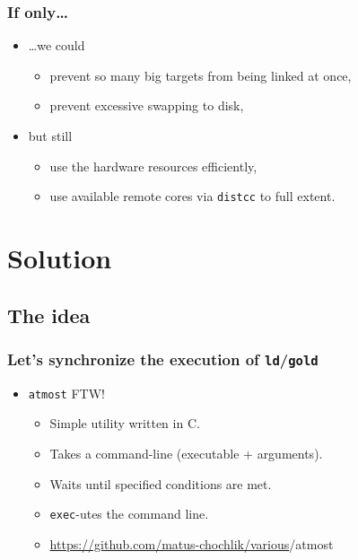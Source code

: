 \documentclass[compress,table,xcolor=table]{beamer}
\newcommand{\shelltext}[1]{\texttt{\colorbox{light-gray}{#1}}}
\begin{document}
\begin{frame}
    \frametitle{If only\ldots}
  \begin{itemize}
    \LARGE
    \item \ldots we could
    \begin{itemize}
      \Large
      \item prevent so many big targets from being linked at once,
      \item prevent excessive swapping to disk,
    \end{itemize}
    \item but still
    \begin{itemize}
      \Large
      \item use the hardware resources efficiently,
	  \item use available remote cores via \shelltext{distcc} to full extent.
    \end{itemize}
  \end{itemize}
\end{frame}
\section{Solution}
\subsection{The idea}
\begin{frame}
	\frametitle{Let's synchronize the execution of \shelltext{ld}/\shelltext{gold}}
  \begin{itemize}
    \LARGE
    \item \shelltext{atmost} FTW!
    \begin{itemize}
	  \large
      \item Simple utility written in C.
      \item Takes a command-line (executable + arguments).
      \item Waits until specified conditions are met.
	  \item \shelltext{exec}-utes the command line.
	  \item {\small\url{https://github.com/matus-chochlik/various}/atmost}
	  
    \end{itemize}
  \end{itemize}
\end{frame}
\end{document}
